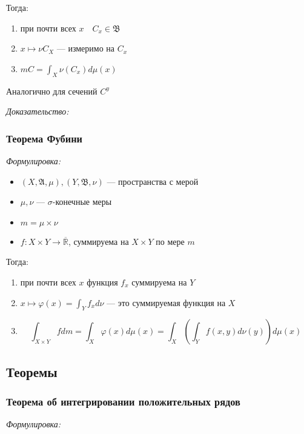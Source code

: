 \documentclass{article}
\def\rinf{\overline{\mathbb{R}}}
\begin{document}
Тогда: 

\begin{enumerate}
    \item при почти всех $x \quad C_{x} \in \mathfrak{B}$ 
    \item $x \mapsto \nu C_{X}$ --- измеримо на $C_{x}$
    \item $m C = \int_{X} \nu (C_{x}) d\mu(x)$
\end{enumerate}

Аналогично для сечений $C^{y}$

\textit{Доказательство:}


\subsubsection{Теорема Фубини}
\textit{Формулировка:}

\begin{itemize}
    \item $(X, \mathfrak{A}, \mu), (Y, \mathfrak{B}, \nu)$ --- пространства с мерой
    \item $\mu, \nu$ --- $\sigma$-конечные меры
    \item $m = \mu \times \nu$
    \item $f: X \times Y \rightarrow \rinf$, суммируема на $X \times Y$ по мере $m$
\end{itemize}

Тогда:

\begin{enumerate}
    \item при почти всех $x$ функция $f_{x}$ суммируема на $Y$
    \item $x \mapsto \varphi(x) = \int_{Y} f_{x} d\nu$ --- это суммируемая функция на $X$
    \item \[\int_{X \times Y} f dm= \int_{X} \varphi(x) d \mu(x) = \int_{X} \left( \int_{Y} f(x, y) d  \nu (y)\right) d \mu(x)\]
\end{enumerate}

\newpage

\subsection{Теоремы}

\subsubsection{Теорема об интегрировании положительных рядов}
\textit{Формулировка:}
\end{document}
